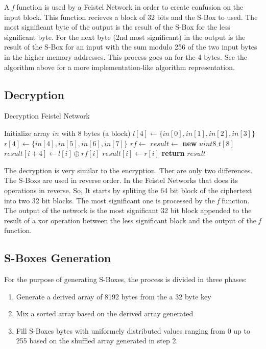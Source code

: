 \documentclass{article} %
\begin{document}
A \textit{f} function is used by a Feistel Network in order to create confusion on the input block.
This function recieves a block of 32 bits and the S-Box to used. The most significant byte of the output is 
the result of the S-Box for the less significant byte. For the next byte (2nd most significant) in the 
output is the result of the S-Box for an input with the sum modulo 256 of the two input bytes in the higher memory addresses.
This process goes on for the 4 bytes. See the algorithm above for a more implementation-like algorithm representation.

\subsection{Decryption}

\begin{algorithm}[H]
  \caption{Decryption Feistel Network}
  \begin{algorithmic}[1]
      \State Initialize array $in$ with 8 bytes (a block)
      \State $l[4] \gets \{in[0], in[1], in[2], in[3]\}$
      \State $r[4] \gets \{in[4], in[5], in[6], in[7]\}$
      \State $rf \gets$ 
      \State $result \gets$ \textbf{new} $uint8\_t[8]$
          \State $result[i + 4] \gets l[i] \oplus rf[i]$
          \State $result[i] \gets r[i]$
      \EndFor
      \State \textbf{return} $result$
  \end{algorithmic}
  \end{algorithm}

The decryption is very similar to the encryption. Ther are only two differences. The S-Boxs are used in reverse order. In the Feistel Networks that does
its operations in reverse. So, It starts by spliting the 64 bit block of the ciphertext into two 32 bit blocks.
The most significant one is processed by the \textit{f} function.
The output of the network is the most significant 32 bit block appended to the result of a xor operation between 
the less significant block and the output of the \textit{f} function.

\subsection{S-Boxes Generation}
\label{sboxgen}
For the purpose of generating S-Boxes, the process is divided in three phases:
\begin{enumerate}
  \item Generate a derived array of 8192 bytes from the a 32 byte key
  \item Mix a sorted array based on the derived array generated
  \item Fill S-Boxes bytes with uniformely distributed values ranging from 0 up to 255 based on the shuffled array generated in step 2. 
\end{enumerate}
\end{document}
